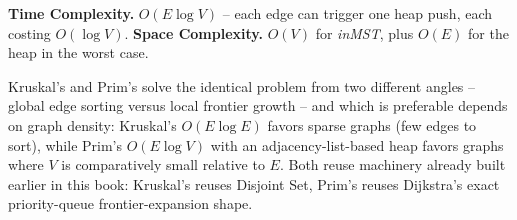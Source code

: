 \begin{complexitybox}
\textbf{Time Complexity.} $O(E \log V)$ -- each edge can trigger one
heap push, each costing $O(\log V)$.
\textbf{Space Complexity.} $O(V)$ for \textit{inMST}, plus $O(E)$ for
the heap in the worst case.
\end{complexitybox}

\begin{takeawaybox}
Kruskal's and Prim's solve the identical problem from two different
angles -- global edge sorting versus local frontier growth -- and
which is preferable depends on graph density: Kruskal's
$O(E\log E)$ favors sparse graphs (few edges to sort), while Prim's
$O(E\log V)$ with an adjacency-list-based heap favors graphs where $V$
is comparatively small relative to $E$. Both reuse machinery already
built earlier in this book: Kruskal's reuses Disjoint Set, Prim's
reuses Dijkstra's exact priority-queue frontier-expansion shape.
\end{takeawaybox}
